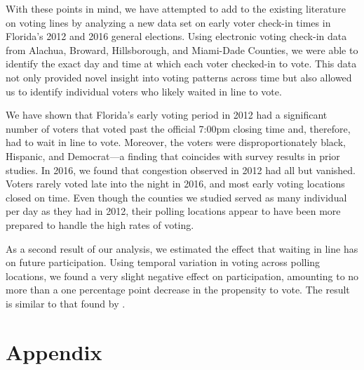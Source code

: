 \documentclass[12pt,titlepage]{article}
\begin{document}
With these points in mind, we have attempted to add to the existing
literature on voting lines by analyzing a new data set on early voter
check-in times in Florida's 2012 and 2016 general elections. Using
electronic voting check-in data from Alachua, Broward, Hillsborough,
and Miami-Dade Counties, we were able to identify the exact day and
time at which each voter checked-in to vote.  This data not only
provided novel insight into voting patterns across time but also
allowed us to identify individual voters who likely waited in line to
vote.

We have shown that Florida's early voting period in 2012 had a
significant number of voters that voted past the official 7:00pm
closing time and, therefore, had to wait in line to vote.  Moreover,
the voters were disproportionately black, Hispanic, and Democrat---a
finding that coincides with survey results in prior studies.  In 2016,
we found that congestion observed in 2012 had all but vanished.
Voters rarely voted late into the night in 2016, and most early voting
locations closed on time.  Even though the counties we studied served
as many individual per day as they had in 2012, their polling
locations appear to have been more prepared to handle the high rates
of voting.
  
As a second result of our analysis, we estimated the effect that
waiting in line has on future participation.  Using temporal variation
in voting across polling locations, we found a very slight negative
effect on participation, amounting to no more than a one percentage
point decrease in the propensity to vote. The result is similar to
that found by \citet{pettigrew:racegapwaittimes}.

% 

\clearpage
\newpage





\newpage
\appendix
\section*{Appendix}

 
\end{document}
